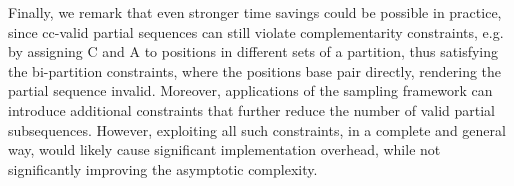 \documentclass[10pt]{article}
\newcommand{\Def}[1]{\emph{#1}}
\newcommand{\Nuc}[1]{{\sf #1}}
\newcommand{\Ab}{\Nuc{A}}
\newcommand{\Cb}{\Nuc{C}}
\newcommand{\Gb}{\Nuc{G}}
\newcommand{\Ub}{\Nuc{U}}
\newcommand{\citet}[1]{\cite{#1}}
\begin{document}
    Finally, we remark that even stronger time savings could be possible
    in practice, since cc-valid partial sequences can still violate
    complementarity constraints, e.g. by assigning C and A to positions in
    different sets of a partition, thus satisfying the bi-partition
    constraints, where the positions base pair directly, rendering the
    partial sequence invalid. Moreover, applications of the sampling
    framework can introduce additional constraints that further reduce
    the number of valid partial subsequences. However, exploiting all such
    constraints, in a complete and general way, would likely cause significant
    implementation overhead, while not significantly improving
    the asymptotic complexity.


\end{document}
